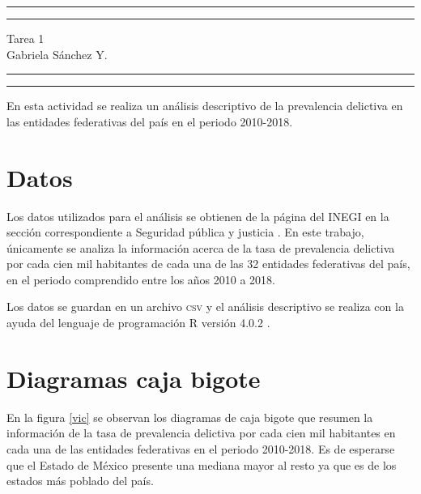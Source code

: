 \documentclass[12pt]{article}
\begin{document}
\thispagestyle{empty}
\hrule height2.5pt
\vspace{.1cm}
\hrule height1pt

\begin{center}
Tarea 1\\
Gabriela S\'anchez Y.\\
\end{center}

\vspace{.3cm}
\hrule height1pt
\vspace{.1cm}
\hrule height2.5pt
\vspace*{.5cm}

En esta actividad se realiza un análisis descriptivo de la prevalencia delictiva en las entidades federativas del país en el periodo 2010-2018.

\section{Datos}

Los datos utilizados para el análisis se obtienen de la página del INEGI en la sección correspondiente a Seguridad pública y justicia \cite{inegi}. En este trabajo, únicamente se analiza la información acerca de la tasa de prevalencia delictiva por cada cien mil habitantes de cada una de las 32 entidades federativas del país, en el periodo comprendido entre los años 2010 a 2018.


Los datos se guardan en un archivo \textsc{csv} y el análisis descriptivo se realiza con la ayuda del lenguaje de programación \textsc{R} versión 4.0.2 \cite{r}.


\section{Diagramas caja bigote}

En la figura \ref{vic} se observan los diagramas de caja bigote que resumen la información de la tasa de prevalencia delictiva por cada cien mil habitantes en cada una de las entidades federativas en el periodo 2010-2018. Es de esperarse que el Estado de México presente una mediana mayor al resto ya que es de los estados más poblado del país.
\end{document}
